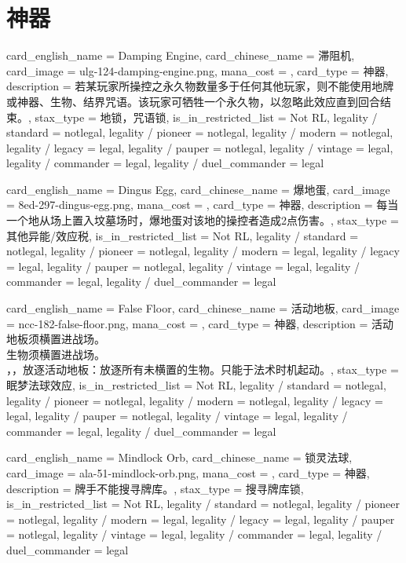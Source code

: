 \documentclass[lang = cn, color = black, 10pt]{AllThatStax}
\begin{document}
\section{神器}

\card
{
	card_english_name = {Damping Engine},
	card_chinese_name = {滞阻机},
	card_image = ulg-124-damping-engine.png,
	mana_cost = ,
	card_type = 神器,
	description = {若某玩家所操控之永久物数量多于任何其他玩家，则不能使用地牌或神器、生物、结界咒语。该玩家可牺牲一个永久物，以忽略此效应直到回合结束。},
	stax_type = 地锁，咒语锁,
	is_in_restricted_list = Not RL,
	legality / standard = notlegal,
	legality / pioneer = notlegal,
	legality / modern = notlegal,
	legality / legacy = legal,
	legality / pauper = notlegal,
	legality / vintage = legal,
	legality / commander = legal,
	legality / duel_commander = legal
}

\card
{
	card_english_name = {Dingus Egg},
	card_chinese_name = {爆地蛋},
	card_image = 8ed-297-dingus-egg.png,
	mana_cost = ,
	card_type = 神器,
	description = {每当一个地从场上置入坟墓场时，爆地蛋对该地的操控者造成2点伤害。},
	stax_type = 其他异能/效应税,
	is_in_restricted_list = Not RL,
	legality / standard = notlegal,
	legality / pioneer = notlegal,
	legality / modern = legal,
	legality / legacy = legal,
	legality / pauper = notlegal,
	legality / vintage = legal,
	legality / commander = legal,
	legality / duel_commander = legal
}

\card
{
	card_english_name = {False Floor},
	card_chinese_name = {活动地板},
	card_image = ncc-182-false-floor.png,
	mana_cost = ,
	card_type = 神器,
	description = {活动地板须横置进战场。\\
生物须横置进战场。\\
，，放逐活动地板：放逐所有未横置的生物。只能于法术时机起动。},
	stax_type = 眠梦法球效应,
	is_in_restricted_list = Not RL,
	legality / standard = notlegal,
	legality / pioneer = notlegal,
	legality / modern = notlegal,
	legality / legacy = legal,
	legality / pauper = notlegal,
	legality / vintage = legal,
	legality / commander = legal,
	legality / duel_commander = legal
}

\card
{
	card_english_name = {Mindlock Orb},
	card_chinese_name = {锁灵法球},
	card_image = ala-51-mindlock-orb.png,
	mana_cost = ,
	card_type = 神器,
	description = {牌手不能搜寻牌库。},
	stax_type = 搜寻牌库锁,
	is_in_restricted_list = Not RL,
	legality / standard = notlegal,
	legality / pioneer = notlegal,
	legality / modern = legal,
	legality / legacy = legal,
	legality / pauper = notlegal,
	legality / vintage = legal,
	legality / commander = legal,
	legality / duel_commander = legal
}
\end{document}
